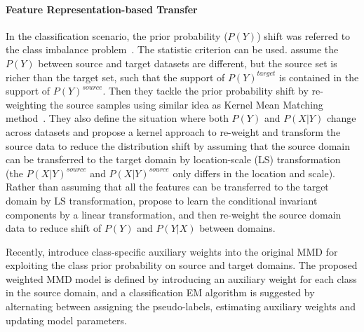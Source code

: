 \documentclass[prodmode]{acmsmall}  %
\begin{document}
\paragraph{Feature Representation-based Transfer}
In the classification scenario, the prior probability ($P(Y)$) shift was referred to the class imbalance problem~\cite{Japkowicz2002,Zhang2013a}. The statistic criterion can be used.  assume the $P(Y)$ between source and target datasets are different, but the source set is richer than the target set, such that the support of $P(Y)^{target}$ is contained in the support of $P(Y)^{source}$. Then they tackle the prior probability shift by re-weighting the source samples using similar idea as Kernel Mean Matching method~\cite{Huang2006}. They also define the situation where both $P(Y)$ and $P(X|Y)$ change across datasets and propose a kernel approach to re-weight and transform the source data to reduce the distribution shift by assuming that the source domain can be transferred to the target domain by location-scale (LS) transformation (the $P(X|Y)^{source}$ and $P(X|Y)^{source}$ only differs in the location and scale). Rather than assuming that all the features can be transferred to the target domain by LS transformation,  propose to learn the conditional invariant components by a linear transformation, and then re-weight the source domain data to reduce shift of $P(Y)$ and $P(Y|X)$ between domains. 

Recently,  introduce class-specific auxiliary weights into the original MMD for exploiting the class prior probability on source and target domains. The proposed weighted MMD model is defined by introducing an auxiliary weight for each class in the source domain, and a classification EM algorithm is suggested by alternating between assigning the pseudo-labels, estimating auxiliary weights and updating model parameters.
\end{document}
